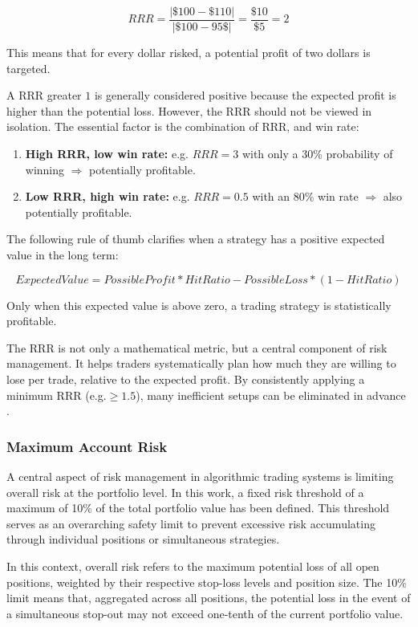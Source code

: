 \[
    RRR = \frac{|\$100 - \$110|}{|\$100 - 95\$|} = \frac{\$10}{\$5} = 2
\]

\noindent
This means that for every dollar risked, a potential profit of two dollars is targeted.

A RRR greater $1$ is generally considered positive because the expected profit is higher than the potential loss.
However, the RRR should not be viewed in isolation.
The essential factor is the combination of RRR, and win rate:

\begin{enumerate}
    \item \textbf{High RRR, low win rate:} e.g.
    $RRR=3$ with only a 30\% probability of winning $\Rightarrow$ potentially profitable.
    \item \textbf{Low RRR, high win rate:} e.g.
    $RRR=0.5$ with an 80\% win rate $\Rightarrow$ also potentially profitable.
\end{enumerate}

\noindent
The following rule of thumb clarifies when a strategy has a positive expected value in the long term:

\[
    ExpectedValue = PossibleProfit * HitRatio - PossibleLoss * (1 - HitRatio)
\]

\noindent
Only when this expected value is above zero, a trading strategy is statistically profitable.

The RRR is not only a mathematical metric, but a central component of risk management.
It helps traders systematically plan how much they are willing to lose per trade, relative to the expected profit.
By consistently applying a minimum RRR (e.g.$\ge 1.5$), many inefficient setups can be eliminated in advance \cite{bitpanda-crv}.

\subsubsection{Maximum Account Risk}

A central aspect of risk management in algorithmic trading systems is limiting overall risk at the portfolio level.
In this work, a fixed risk threshold of a maximum of 10\% of the total portfolio value has been defined.
This threshold serves as an overarching safety limit to prevent excessive risk accumulating through individual positions or simultaneous strategies.

In this context, overall risk refers to the maximum potential loss of all open positions, weighted by their respective stop-loss levels and position size.
The 10\% limit means that, aggregated across all positions, the potential loss in the event of a simultaneous stop-out may not exceed one-tenth of the current portfolio value.

